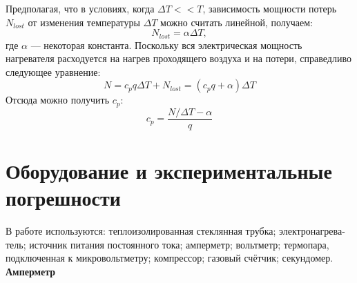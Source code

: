 \documentclass[a4paper,11pt]{article}
\begin{document}
\newline
Предполагая, что в условиях, когда $\Delta T << T$, зависимость мощности потерь $N_{lost}$ от изменения температуры $\Delta T$ можно считать линейной, получаем:
\begin{equation}    \label{eq4}
N_{lost} = \alpha \Delta T,
\end{equation}
где $\alpha$ — некоторая константа.
\newline
Поскольку вся электрическая мощность нагревателя расходуется на нагрев проходящего воздуха и на потери, справедливо следующее уравнение:
\begin{equation}    \label{eq5}
N = c_{p}q \Delta T + N_{lost} = (c_{p}q +\alpha) \Delta T
\end{equation}
Отсюда можно получить $c_{p}$:
\begin{equation}    \label{eq6}
c_{p} = \frac{N / \Delta T - \alpha}{q}
\end{equation}
\section{Оборудование и экспериментальные погрешности}
В работе используются: теплоизолированная стеклянная трубка; электронагрева-
тель; источник питания постоянного тока; амперметр; вольтметр; термопара, подключенная к микровольтметру; компрессор; газовый счётчик; секундомер.
\newline
\textbf{Амперметр}
\end{document}
